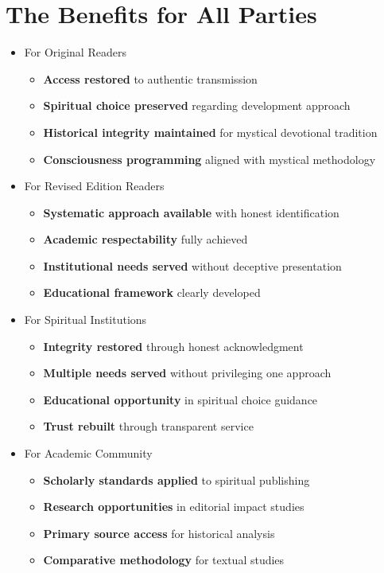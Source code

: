 \documentclass[11pt,twoside]{book}
\begin{document}
\section*{The Benefits for All Parties}
\label{sec:orgca94c29}

\begin{itemize}
\item For Original Readers
\label{sec:org30da3a8}
\begin{itemize}
\item \textbf{\textbf{Access restored}} to authentic transmission
\item \textbf{\textbf{Spiritual choice preserved}} regarding development approach
\item \textbf{\textbf{Historical integrity maintained}} for mystical devotional tradition
\item \textbf{\textbf{Consciousness programming}} aligned with mystical methodology
\end{itemize}
\item For Revised Edition Readers
\label{sec:orge1570dc}
\begin{itemize}
\item \textbf{\textbf{Systematic approach available}} with honest identification
\item \textbf{\textbf{Academic respectability}} fully achieved
\item \textbf{\textbf{Institutional needs served}} without deceptive presentation
\item \textbf{\textbf{Educational framework}} clearly developed
\end{itemize}
\item For Spiritual Institutions
\label{sec:orgfb92304}
\begin{itemize}
\item \textbf{\textbf{Integrity restored}} through honest acknowledgment
\item \textbf{\textbf{Multiple needs served}} without privileging one approach
\item \textbf{\textbf{Educational opportunity}} in spiritual choice guidance
\item \textbf{\textbf{Trust rebuilt}} through transparent service
\end{itemize}
\item For Academic Community
\label{sec:org56a8ea9}
\begin{itemize}
\item \textbf{\textbf{Scholarly standards applied}} to spiritual publishing
\item \textbf{\textbf{Research opportunities}} in editorial impact studies
\item \textbf{\textbf{Primary source access}} for historical analysis
\item \textbf{\textbf{Comparative methodology}} for textual studies
\end{itemize}
\end{itemize}
\end{document}
